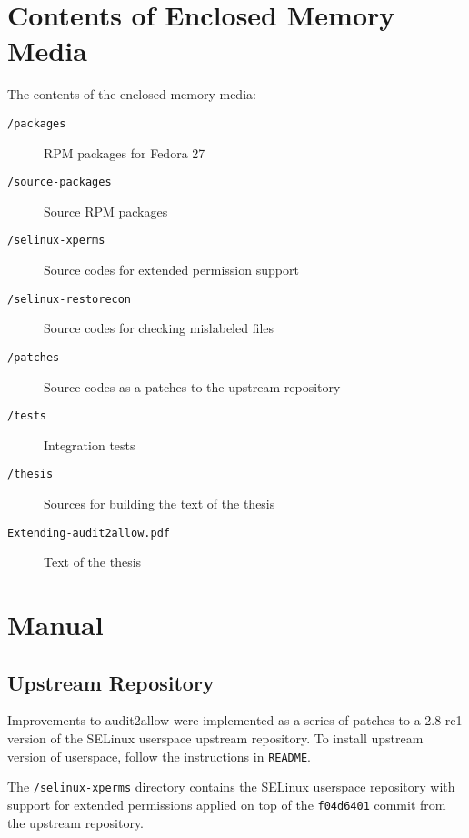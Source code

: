 
\chapter{Contents of Enclosed Memory Media}

The contents of the enclosed memory media:
\begin{description}
    \item [\texttt{/packages}] RPM packages for Fedora 27
    \item [\texttt{/source-packages}] Source RPM packages
    \item [\texttt{/selinux-xperms}] Source codes for extended permission support
    \item [\texttt{/selinux-restorecon}] Source codes for checking mislabeled
        files
    \item [\texttt{/patches}] Source codes as a patches to the upstream
        repository
    \item [\texttt{/tests}] Integration tests
    \item [\texttt{/thesis}] Sources for building the text of the thesis
    \item [\texttt{Extending-audit2allow.pdf}] Text of the thesis
\end{description}

\chapter{Manual}

\section{Upstream Repository}

Improvements to audit2allow were implemented as a series of patches to a 2.8-rc1
version of the SELinux userspace upstream repository. To install upstream
version of userspace, follow the instructions in \texttt{README}.

The \texttt{/selinux-xperms} directory contains the SELinux userspace repository
with support for extended permissions applied on top of the \texttt{f04d6401}
commit from the upstream repository.

